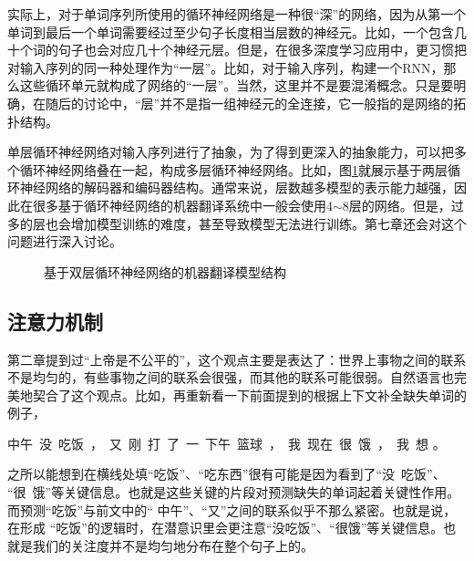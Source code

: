 \parinterval 实际上，对于单词序列所使用的循环神经网络是一种很``深''的网络，因为从第一个单词到最后一个单词需要经过至少句子长度相当层数的神经元。比如，一个包含几十个词的句子也会对应几十个神经元层。但是，在很多深度学习应用中，更习惯把对输入序列的同一种处理作为``一层''。比如，对于输入序列，构建一个RNN，那么这些循环单元就构成了网络的``一层''。当然，这里并不是要混淆概念。只是要明确，在随后的讨论中，``层''并不是指一组神经元的全连接，它一般指的是网络的拓扑结构。

\parinterval 单层循环神经网络对输入序列进行了抽象，为了得到更深入的抽象能力，可以把多个循环神经网络叠在一起，构成多层循环神经网络。比如，图\ref{fig:6-19}就展示基于两层循环神经网络的解码器和编码器结构。通常来说，层数越多模型的表示能力越强，因此在很多基于循环神经网络的机器翻译系统中一般会使用4$\sim$8层的网络。但是，过多的层也会增加模型训练的难度，甚至导致模型无法进行训练。第七章还会对这个问题进行深入讨论。

\begin{figure}[htp]
\centering
 \hspace{10em}
\caption{基于双层循环神经网络的机器翻译模型结构}
\label{fig:6-19}
\end{figure}


\subsection{注意力机制}
\label{sec:6.3.4}

\parinterval 第二章提到过``上帝是不公平的''，这个观点主要是表达了：世界上事物之间的联系不是均匀的，有些事物之间的联系会很强，而其他的联系可能很弱。自然语言也完美地契合了这个观点。比如，再重新看一下前面提到的根据上下文补全缺失单词的例子，

\vspace{0.8em}
\centerline{中午\ 没\ 吃饭\ ，\ 又\ 刚\ 打\ 了\ 一\ 下午\ 篮球\ ，\ 我\ 现在\ 很\ 饿\ ，\ 我\ 想\underline{\quad \quad \quad} 。}
\vspace{0.8em}

\noindent 之所以能想到在横线处填``吃饭''、``吃东西''很有可能是因为看到了``没\ 吃饭''、 ``很\ 饿''等关键信息。也就是这些关键的片段对预测缺失的单词起着关键性作用。而预测``吃饭''与前文中的`` 中午''、``又''之间的联系似乎不那么紧密。也就是说，在形成 ``吃饭''的逻辑时，在潜意识里会更注意``没吃饭''、``很饿''等关键信息。也就是我们的关注度并不是均匀地分布在整个句子上的。

